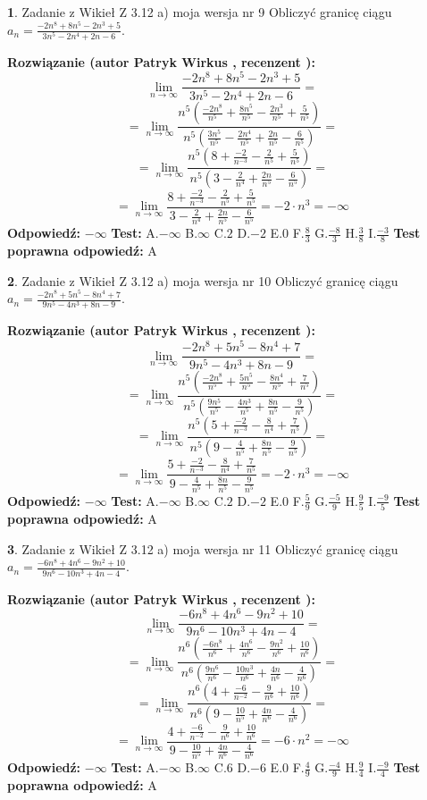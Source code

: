 \documentclass[12pt, a4paper]{article}
\theoremstyle{definition} %
\newtheorem{zad}{}
\newcommand{\zadStart}[1]{\begin{zad}#1\newline}
\newcommand{\zadStop}{\end{zad}}
\newcommand{\rozwStart}[2]{\noindent \textbf{Rozwiązanie (autor #1 , recenzent #2): }\newline}
\newcommand{\rozwStop}{\newline}
\newcommand{\odpStart}{\noindent \textbf{Odpowiedź:}\newline}
\newcommand{\odpStop}{\newline}
\newcommand{\testStart}{\noindent \textbf{Test:}\newline}
\newcommand{\testStop}{\newline}
\newcommand{\kluczStart}{\noindent \textbf{Test poprawna odpowiedź:}\newline}
\newcommand{\kluczStop}{\newline}
\begin{document}
\zadStart{Zadanie z Wikieł Z 3.12 a) moja wersja nr 9}
Obliczyć granicę ciągu $a_{n}=\frac{-2n^{8}+8n^{5}-2n^{3}+5}{3n^{5}-2n^{4}+2n-6}$.
\zadStop
\rozwStart{Patryk Wirkus}{}
$$\lim\limits_{n\to\infty}\frac{-2n^{8}+8n^{5}-2n^{3}+5}{3n^{5}-2n^{4}+2n-6}=$$
$$=\lim\limits_{n\to\infty}\frac{n^{5}\left(\frac{-2n^{8}}{n^{5}}+\frac{8n^{5}}{n^{5}}-\frac{2n^{3}}{n^{5}}+\frac{5}{n^{5}}\right)}{n^{5}\left(\frac{3n^{5}}{n^{5}}-\frac{2n^{4}}{n^{5}}+\frac{2n}{n^{5}}-\frac{6}{n^{5}}\right)}=$$
$$=\lim\limits_{n\to\infty}\frac{n^{5}\left(8+\frac{-2}{n^{-3}}-\frac{2}{n^{5}}+\frac{5}{n^{5}}\right)}
{n^{5}\left(3-\frac{2}{n^{4}}+\frac{2n}{n^{5}}-\frac{6}{n^{5}}\right)}=$$
$$=\lim\limits_{n\to\infty}\frac{8+\frac{-2}{n^{-3}}-\frac{2}{n^{5}}+\frac{5}{n^{5}}}{3-\frac{2}{n^{4}}+\frac{2n}{n^{5}}-\frac{6}{n^{5}}}=-2\cdot n^{3} = -\infty$$
\rozwStop
\odpStart
$-\infty$
\odpStop
\testStart
A.$-\infty$
B.$\infty$
C.$2$
D.$-2$
E.$0$
F.$\frac{8}{3}$
G.$\frac{-8}{3}$
H.$\frac{3}{8}$
I.$\frac{-3}{8}$
\testStop
\kluczStart
A
\kluczStop



\zadStart{Zadanie z Wikieł Z 3.12 a) moja wersja nr 10}
Obliczyć granicę ciągu $a_{n}=\frac{-2n^{8}+5n^{5}-8n^{4}+7}{9n^{5}-4n^{3}+8n-9}$.
\zadStop
\rozwStart{Patryk Wirkus}{}
$$\lim\limits_{n\to\infty}\frac{-2n^{8}+5n^{5}-8n^{4}+7}{9n^{5}-4n^{3}+8n-9}=$$
$$=\lim\limits_{n\to\infty}\frac{n^{5}\left(\frac{-2n^{8}}{n^{5}}+\frac{5n^{5}}{n^{5}}-\frac{8n^{4}}{n^{5}}+\frac{7}{n^{5}}\right)}{n^{5}\left(\frac{9n^{5}}{n^{5}}-\frac{4n^{3}}{n^{5}}+\frac{8n}{n^{5}}-\frac{9}{n^{5}}\right)}=$$
$$=\lim\limits_{n\to\infty}\frac{n^{5}\left(5+\frac{-2}{n^{-3}}-\frac{8}{n^{4}}+\frac{7}{n^{5}}\right)}
{n^{5}\left(9-\frac{4}{n^{5}}+\frac{8n}{n^{5}}-\frac{9}{n^{5}}\right)}=$$
$$=\lim\limits_{n\to\infty}\frac{5+\frac{-2}{n^{-3}}-\frac{8}{n^{4}}+\frac{7}{n^{5}}}{9-\frac{4}{n^{5}}+\frac{8n}{n^{5}}-\frac{9}{n^{5}}}=-2\cdot n^{3} = -\infty$$
\rozwStop
\odpStart
$-\infty$
\odpStop
\testStart
A.$-\infty$
B.$\infty$
C.$2$
D.$-2$
E.$0$
F.$\frac{5}{9}$
G.$\frac{-5}{9}$
H.$\frac{9}{5}$
I.$\frac{-9}{5}$
\testStop
\kluczStart
A
\kluczStop



\zadStart{Zadanie z Wikieł Z 3.12 a) moja wersja nr 11}
Obliczyć granicę ciągu $a_{n}=\frac{-6n^{8}+4n^{6}-9n^{2}+10}{9n^{6}-10n^{3}+4n-4}$.
\zadStop
\rozwStart{Patryk Wirkus}{}
$$\lim\limits_{n\to\infty}\frac{-6n^{8}+4n^{6}-9n^{2}+10}{9n^{6}-10n^{3}+4n-4}=$$
$$=\lim\limits_{n\to\infty}\frac{n^{6}\left(\frac{-6n^{8}}{n^{6}}+\frac{4n^{6}}{n^{6}}-\frac{9n^{2}}{n^{6}}+\frac{10}{n^{6}}\right)}{n^{6}\left(\frac{9n^{6}}{n^{6}}-\frac{10n^{3}}{n^{6}}+\frac{4n}{n^{6}}-\frac{4}{n^{6}}\right)}=$$
$$=\lim\limits_{n\to\infty}\frac{n^{6}\left(4+\frac{-6}{n^{-2}}-\frac{9}{n^{6}}+\frac{10}{n^{6}}\right)}
{n^{6}\left(9-\frac{10}{n^{5}}+\frac{4n}{n^{6}}-\frac{4}{n^{6}}\right)}=$$
$$=\lim\limits_{n\to\infty}\frac{4+\frac{-6}{n^{-2}}-\frac{9}{n^{6}}+\frac{10}{n^{6}}}{9-\frac{10}{n^{5}}+\frac{4n}{n^{6}}-\frac{4}{n^{6}}}=-6\cdot n^{2} = -\infty$$
\rozwStop
\odpStart
$-\infty$
\odpStop
\testStart
A.$-\infty$
B.$\infty$
C.$6$
D.$-6$
E.$0$
F.$\frac{4}{9}$
G.$\frac{-4}{9}$
H.$\frac{9}{4}$
I.$\frac{-9}{4}$
\testStop
\kluczStart
A
\kluczStop
\end{document}
